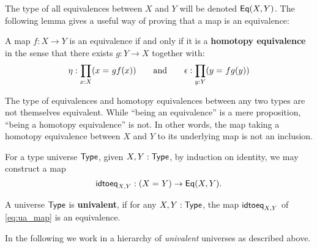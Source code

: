 The type of all equivalences between $X$ and $Y$ will be denoted $\mathsf{Eq}(X, Y)$. The following lemma gives a useful way of proving that a map is an equivalence:

\begin{lem}
 A map $f \colon X \to Y$ is an equivalence if and only if it is a \textbf{homotopy equivalence} in the sense that there exists $g \colon Y \to X$ together with:
 \[\eta : \prod_{x : X} (x =_{} gf(x)) \qquad \text{and} \qquad \epsilon : \prod_{y : Y} (y =_{} fg(y))\]
\end{lem}

The type of equivalences and homotopy equivalences between any two types are not themselves equivalent. 
While ``being an equivalence'' is a mere proposition, ``being a homotopy equivalence'' is not. 
In other words, the map taking a homotopy equivalence between $X$ and $Y$ to its underlying map is not an inclusion.

For a type universe $\mathsf{Type}$, given $X, Y : \mathsf{Type}$, by induction on identity, we may construct a map
\begin{equation} \label{eq:ua_map}
 \mathsf{idtoeq}_{X,Y} : (X =_{} Y) \to \mathsf{Eq}(X, Y).
\end{equation}

\begin{defn}
 A universe $\mathsf{Type}$ is \textbf{univalent}, if for any $X, Y : \mathsf{Type}$, the map $\mathsf{idtoeq}_{X,Y}$ of \autoref{eq:ua_map} is an equivalence.
\end{defn}
In the following we work in a hierarchy of \emph{univalent} universes as described above.

